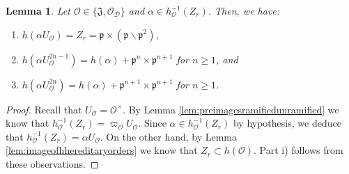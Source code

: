 \documentclass{article}
\newtheorem{lem}{Lemma}[section]
\theoremstyle{named}
\newcommand{\D}{\mathcal{D}}
\newcommand{\J}{\mathfrak{J}}
\renewcommand{\O}{\mathcal{O}}
\newcommand{\p}{\mathfrak{p}}
\begin{document}
\begin{lem}\label{lem:charpolyramified}
Let $\O \in \{\J, \O_\D\}$ and $\alpha \in h_\O^{-1}(Z_r)$. Then, we have: 
\begin{enumerate}
    \item [i)]$h(\alpha U_\O) = Z_r = \p \times (\p \smallsetminus \p^2)$,
    \item [ii)]$h(\alpha U_\O^{2n - 1}) = h(\alpha) + \p^n \times \p^{n + 1}$ for $n \geq 1$, and
    \item [iii)]$h(\alpha U_\O^{2n}) = h(\alpha) + \p^{n + 1}\times \p^{n + 1}$ for $n \geq 1$.
\end{enumerate}
\end{lem}
\begin{proof}
Recall that $U_\O = \O^\times$. By Lemma \ref{lem:preimagesramifiedunramified} we know that $h_\O^{-1}(Z_r) = \varpi_\O U_\O$. Since $\alpha \in h_\O^{-1}(Z_r)$ by hypothesis, we deduce that $h_\O^{-1}(Z_r) = \alpha U_\O$. On the other hand, by Lemma \ref{lem:imageofhhereditaryorders} we know that $Z_r \subset h(\O)$. Part i) follows from these observations. 


\end{proof}
\end{document}
